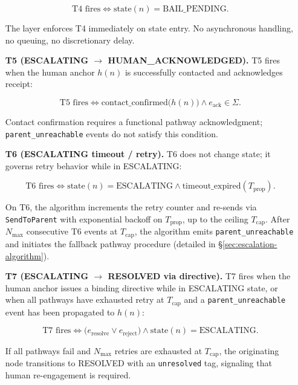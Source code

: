 \begin{enumerate}
\begin{equation}
\text{T4 fires} \iff \text{state}(n) = \text{BAIL\_PENDING}. \tag{T4}
\end{equation}

The \fact{} layer enforces T4 immediately on state entry. No asynchronous handling, no queuing, no discretionary delay.

\item[\textbf{T5 (ESCALATING $\rightarrow$ HUMAN\_ACKNOWLEDGED).}] T5 fires when the human anchor $h(n)$ is successfully contacted and acknowledges receipt:

\begin{equation}
\text{T5 fires} \iff \text{contact\_confirmed}\bigl(h(n)\bigr) \land e_{\text{ack}} \in \Sigma. \tag{T5}
\end{equation}

Contact confirmation requires a functional pathway acknowledgment; \texttt{parent\_unreachable} events do not satisfy this condition.

\item[\textbf{T6 (ESCALATING timeout / retry).}] T6 does not change state; it governs retry behavior while in ESCALATING:

\begin{equation}
\text{T6 fires} \iff \text{state}(n) = \text{ESCALATING} \land \text{timeout\_expired}(T_{\text{prop}}). \tag{T6}
\end{equation}

On T6, the algorithm increments the retry counter and re-sends via \texttt{SendToParent} with exponential backoff on $T_{\text{prop}}$, up to the ceiling $T_{\text{cap}}$. After $N_{\max}$ consecutive T6 events at $T_{\text{cap}}$, the algorithm emits \texttt{parent\_unreachable} and initiates the fallback pathway procedure (detailed in \S\ref{sec:escalation-algorithm}).

\item[\textbf{T7 (ESCALATING $\rightarrow$ RESOLVED via directive).}] T7 fires when the human anchor issues a binding directive while in ESCALATING state, or when all pathways have exhausted retry at $T_{\text{cap}}$ and a \texttt{parent\_unreachable} event has been propagated to $h(n)$:

\begin{equation}
\text{T7 fires} \iff \bigl(e_{\text{resolve}} \lor e_{\text{reject}}\bigr) \land \text{state}(n) = \text{ESCALATING}. \tag{T7}
\end{equation}

If all pathways fail and $N_{\max}$ retries are exhausted at $T_{\text{cap}}$, the originating node transitions to RESOLVED with an \texttt{unresolved} tag, signaling that human re-engagement is required.


\end{enumerate}
